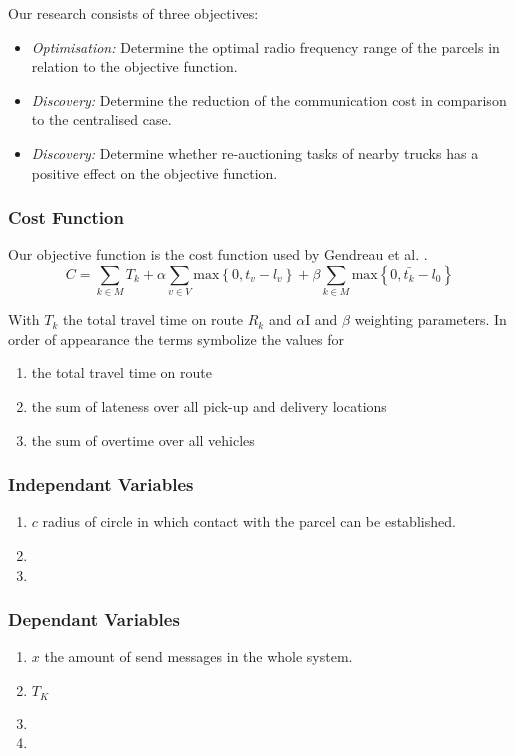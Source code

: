 \documentclass[../main.tex]{subfiles}
\begin{document}
Our research consists of three objectives:
\begin{itemize}
	\item \textit{Optimisation:} Determine the optimal radio frequency range of the parcels in relation to the objective function.
	\item \textit{Discovery:} Determine the reduction of the communication cost in comparison to the centralised case.
	\item \textit{Discovery:} Determine whether re-auctioning tasks of nearby trucks has a positive effect on the objective function.
\end{itemize}

\subsubsection{Cost Function}
Our objective function is the cost function used by Gendreau et al. \cite{gendreau2006neighborhood}.
$$
C = \sum_{k \in M}{T_k} + \alpha \sum_{v \in V} \text{max} \left\{ 0, t_v - l_v \right\} + \beta \sum_{k \in M} \text{max} \left\{0, \bar{t_k} - l_0 \right\}
$$

With $T_k$ the total travel time on route $R_k$ and $\alpha$I and $\beta$ weighting parameters. In order of appearance the terms symbolize the values for
\begin{enumerate}
	\item the total travel time on route
	\item the sum of lateness over all pick-up and delivery locations
	\item the sum of overtime over all vehicles
\end{enumerate}

\subsubsection{Independant Variables }
\begin{enumerate}
	\item $c$ radius of circle in which contact with the parcel can be established.
	\item
	\item
\end{enumerate}
\subsubsection{Dependant Variables}
\begin{enumerate}
	\item $x$ the amount of send messages in the whole system.
	\item $T_K$
	\item
	\item
\end{enumerate}
\end{document}
